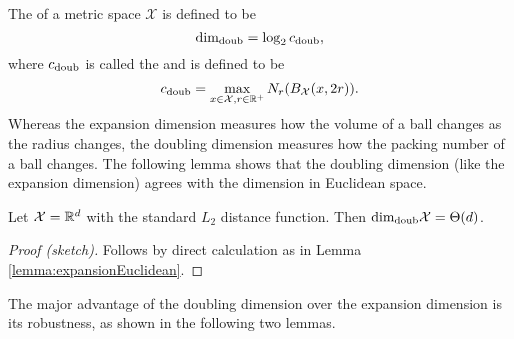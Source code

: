\documentclass[thesis.tex]{subfiles}
\newcommand{\set}[1]{\mathcal {#1}}
\newcommand{\radius}{r}
\newcommand{\minkdim}{\text{dim}_\textnormal{Mink}}
\newcommand{\doubdim}{\text{dim}_\textnormal{doub}}
\newcommand{\cdoub}{c_\textnormal{doub}}
\begin{document}
%

%

The  of a metric space $\set X$ is defined to be
\begin{equation}
    \doubdim = \log_2 \cdoub
    ,
\end{equation}
where $\cdoub$ is called the  and is defined to be
\begin{equation}
    \cdoub = \max_{x\in\set X, \radius\in\R^+} N_\radius(B_{\set X}(x,2\radius))
    .
\end{equation}
Whereas the expansion dimension measures how the volume of a ball changes as the radius changes,
the doubling dimension measures how the packing number of a ball changes.
The following lemma shows that the doubling dimension (like the expansion dimension) agrees with the dimension in Euclidean space.
\begin{lemma}
    \label{lemma:doubleEuclidean}
    Let $\set X=\R^d$ with the standard $L_2$ distance function.
    Then $\doubdim\set X=\Theta(d)$.
\end{lemma}
\begin{proof}[Proof (sketch)]
    Follows by direct calculation as in Lemma \ref{lemma:expansionEuclidean}.
\end{proof}
\noindent
The major advantage of the doubling dimension over the expansion dimension is its robustness,
as shown in the following two lemmas.
\end{document}
